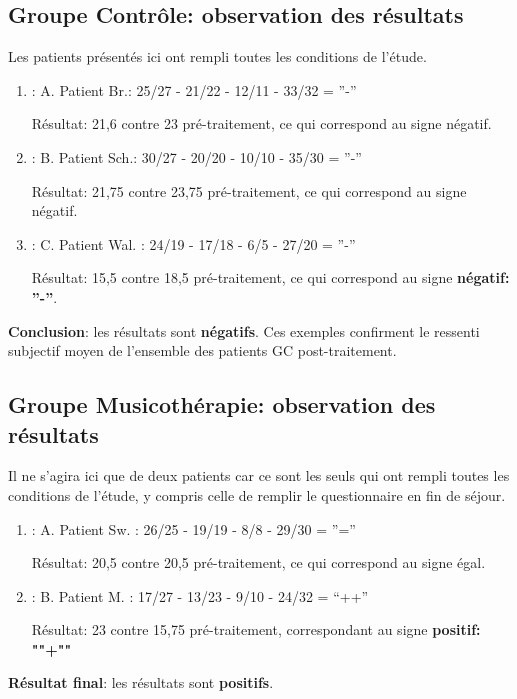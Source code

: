 \subsection{Groupe Contrôle: observation des résultats }
Les patients présentés ici ont rempli toutes les conditions de l'étude.
\begin{enumerate}
\item : A. Patient Br.:  25/27 - 21/22 - 12/11 - 33/32 =  ''-''

          Résultat: 21,6 contre 23 pré-traitement,  ce qui
        correspond au signe négatif.
      \item : B. Patient Sch.: 30/27 - 20/20 -  10/10 - 35/30 = ''-''

         Résultat: 21,75 contre 23,75 pré-traitement, ce qui
        correspond au signe négatif.

 		\item :  C. Patient Wal. : 24/19 -  17/18 - 6/5 -
                  27/20 =  ''-''

                  Résultat: 15,5 contre 18,5 pré-traitement, ce qui
        correspond au signe \textbf{négatif: ''-''}.
 	\end{enumerate}


       \textbf{ Conclusion}: les résultats sont \textbf{négatifs}.
        Ces exemples confirment
        le ressenti subjectif moyen de l'ensemble des patients
        GC post-traitement.
        \subsection{Groupe Musicothérapie: observation des résultats}
 Il ne s'agira ici que de  deux patients car ce sont les seuls qui ont rempli toutes les conditions de l'étude, 
 y compris celle de remplir le questionnaire en fin de séjour.

\begin{enumerate}
 		\item : A. Patient Sw. : 26/25 - 19/19 - 8/8 - 29/30 =  ''=''



  Résultat: 20,5 contre 20,5 pré-traitement, ce qui
        correspond au signe égal.



 		\item : B. Patient M. : 17/27 - 13/23 -  9/10 - 24/32 = ``++''

              Résultat: 23 contre 15,75 pré-traitement, correspondant
              au signe \textbf{positif: ""+""}
            \end{enumerate}
 \textbf{ Résultat final}: les résultats sont \textbf{positifs}.


